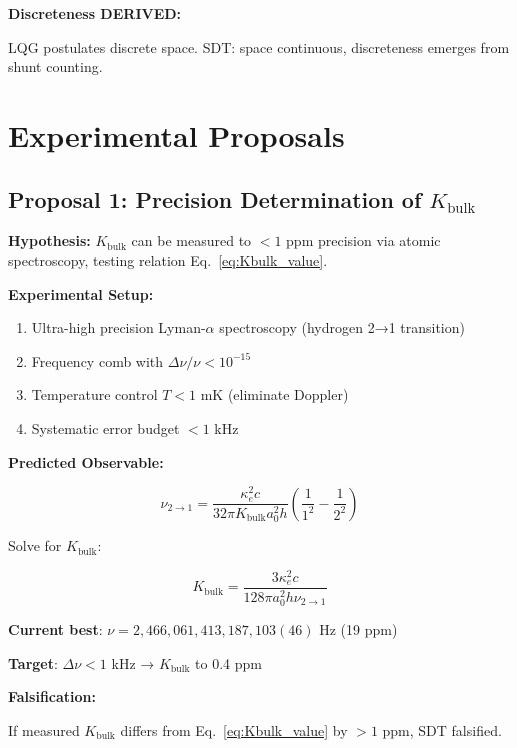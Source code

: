 \textbf{Discreteness DERIVED:}

LQG postulates discrete space. SDT: space continuous, discreteness emerges from shunt counting.

\section{Experimental Proposals}

\subsection{Proposal 1: Precision Determination of $K_{\text{bulk}}$}

\textbf{Hypothesis:} $K_{\text{bulk}}$ can be measured to $< 1$ ppm precision via atomic spectroscopy, testing relation Eq.~\ref{eq:Kbulk_value}.

\textbf{Experimental Setup:}

\begin{enumerate}
\item Ultra-high precision Lyman-$\alpha$ spectroscopy (hydrogen 2→1 transition)
\item Frequency comb with $\Delta \nu/\nu < 10^{-15}$
\item Temperature control $T < 1$ mK (eliminate Doppler)
\item Systematic error budget $< 1$ kHz
\end{enumerate}

\textbf{Predicted Observable:}

\begin{equation}
\nu_{2 \to 1} = \frac{\kappa_e^2 c}{32\pi K_{\text{bulk}} a_0^2 h} \left(\frac{1}{1^2} - \frac{1}{2^2}\right)
\end{equation}

Solve for $K_{\text{bulk}}$:

\begin{equation}
K_{\text{bulk}} = \frac{3\kappa_e^2 c}{128\pi a_0^2 h \nu_{2 \to 1}}
\end{equation}

\textbf{Current best}: $\nu = 2{,}466{,}061{,}413{,}187{,}103(46)$ Hz (19 ppm) \cite{parthey2011improved}

\textbf{Target}: $\Delta \nu < 1$ kHz → $K_{\text{bulk}}$ to 0.4 ppm

\textbf{Falsification:}

If measured $K_{\text{bulk}}$ differs from Eq.~\ref{eq:Kbulk_value} by $> 1$ ppm, SDT falsified.

